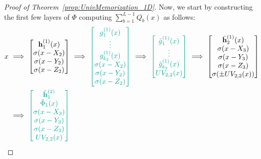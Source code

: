 \documentclass{article}
\numberwithin{equation}{section}
\theoremstyle{definition}
\begin{document}
\begin{proof}[{Proof of Theorem~\ref{prop:UnivMemorization_1D}}]
Now, we start by constructing the first few layers of $\Phi$ computing $\sum_{b=1}^{L-1} Q_b(x)$ as follows: 
\allowdisplaybreaks
\begin{align}
\label{eq:phi_layer_detail}
    x 
    \ &\Longrightarrow \ 
    \begin{bmatrix}
        \mathbf{h}_1^{(1)} (x)  \\  
        \sigma(x - X_{2})  \\  
        \sigma(x - Y_{2})  \\
        \sigma(x - Z_{2})
    \end{bmatrix}
    \ \Longrightarrow \ 
    {\color{persiangreen}
    \begin{bmatrix}
        g_1^{(1)} (x)  \\  
        \vdots  \\  
        g_{k_2}^{(1)} (x)  \\
        \sigma(x - X_{2})  \\  
        \sigma(x - Y_{2})  \\
        \sigma(x - Z_{2})
    \end{bmatrix}
    }
    \ \Longrightarrow \ 
    {\color{persiangreen}
    \begin{bmatrix}
        \tilde{g}_1^{(1)} (x)  \\  
        \vdots  \\  
        \tilde{g}_{k_2}^{(1)} (x)  \\
        UV_{2,2}(x)
    \end{bmatrix}
    }
    \ \Longrightarrow \
    \begin{bmatrix}
        \Bar{\mathbf{h}}_2^{(1)} (x)  \\
        \sigma(x - X_{3})  \\  
        \sigma(x - Y_{3})  \\
        \sigma(x - Z_{3})  \\
        \sigma( \pm UV_{2,2}(x) )
    \end{bmatrix}
    \nonumber
    \\
    \ &\Longrightarrow \ 
    {\color{persiangreen}
    \begin{bmatrix} 
        \tilde{\mathbf{h}}_1^{(2)}  \\
        \tilde{\Phi}_1(x)  \\  
        \sigma(x - X_{3})  \\  
        \sigma(x - Y_{3})  \\
        \sigma(x - Z_{3})  \\
        UV_{2,2}(x)
    \end{bmatrix}
}
\end{align}
\end{proof}
\end{document}
